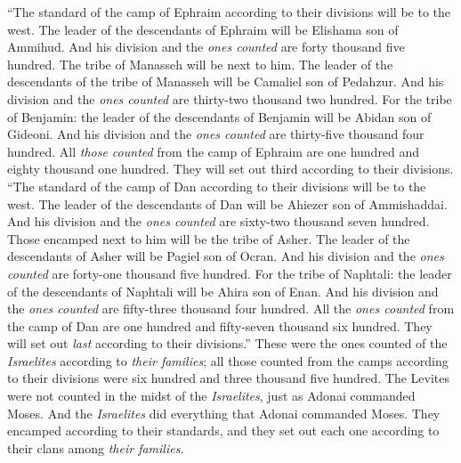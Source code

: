 \begin{biblechapter}
\verse “The standard of the camp of Ephraim according to their divisions will be to the west. The leader of the descendants of Ephraim will be Elishama son of Ammihud.
\verse And his division and the \textit{ones counted} are forty thousand five hundred.
\verse The tribe of Manasseh will be next to him. The leader of the descendants of the tribe of Manasseh will be Camaliel son of Pedahzur.
\verse And his division and the \textit{ones counted} are thirty-two thousand two hundred.
\verse For the tribe of Benjamin: the leader of the descendants of Benjamin will be Abidan son of Gideoni.
\verse And his division and the \textit{ones counted} are thirty-five thousand four hundred.
\verse All \textit{those counted} from the camp of Ephraim are one hundred and eighty thousand one hundred. They will set out third according to their divisions.
\verse “The standard of the camp of Dan according to their divisions will be to the west. The leader of the descendants of Dan will be Ahiezer son of Ammishaddai.
\verse And his division and the \textit{ones counted} are sixty-two thousand seven hundred.
\verse Those encamped next to him will be the tribe of Asher. The leader of the descendants of Asher will be Pagiel son of Ocran.
\verse And his division and the \textit{ones counted} are forty-one thousand five hundred.
\verse For the tribe of Naphtali: the leader of the descendants of Naphtali will be Ahira son of Enan.
\verse And his division and the \textit{ones counted} are fifty-three thousand four hundred.
\verse All the \textit{ones counted} from the camp of Dan are one hundred and fifty-seven thousand six hundred. They will set out \textit{last} according to their divisions.”
\verse These were the ones counted of the \textit{Israelites} according to \textit{their families}; all those counted from the camps according to their divisions were six hundred and three thousand five hundred.
\verse The Levites were not counted in the midst of the \textit{Israelites}, just as Adonai commanded Moses.
\verse And the \textit{Israelites} did everything that Adonai commanded Moses. They encamped according to their standards, and they set out each one according to their clans among \textit{their families}.
\end{biblechapter}

